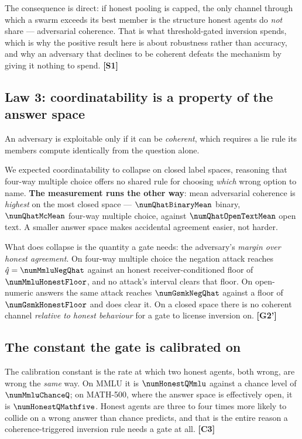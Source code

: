 The consequence is direct: if honest pooling is capped, the only channel through
which a swarm exceeds its best member is the structure honest agents do
\emph{not} share --- adversarial coherence. That is what threshold-gated
inversion spends, which is why the positive result here is about robustness
rather than accuracy, and why an adversary that declines to be coherent defeats
the mechanism by giving it nothing to spend. \textbf{[S1]}

\subsection{Law 3: coordinatability is a property of the answer space}

An adversary is exploitable only if it can be \emph{coherent}, which requires a
lie rule its members compute identically from the question alone.

We expected coordinatability to collapse on closed label spaces, reasoning that
four-way multiple choice offers no shared rule for choosing \emph{which} wrong
option to name. \textbf{The measurement runs the other way}: mean adversarial
coherence is \emph{highest} on the most closed space --- $\numQhatBinaryMean$
binary, $\numQhatMcMean$ four-way multiple choice, against
$\numQhatOpenTextMean$ open text. A smaller answer space makes accidental
agreement easier, not harder.

What does collapse is the quantity a gate needs: the adversary's \emph{margin
over honest agreement}. On four-way multiple choice the negation attack reaches
$\hat q = \numMmluNegQhat$ against an honest receiver-conditioned floor of
$\numMmluHonestFloor$, and no attack's interval clears that floor. On
open-numeric answers the same attack reaches $\numGsmkNegQhat$ against a floor of
$\numGsmkHonestFloor$ and does clear it. On a closed space there is no coherent
channel \emph{relative to honest behaviour} for a gate to license inversion on.
\textbf{[G2']}

\subsection{The constant the gate is calibrated on}

The calibration constant is the rate at which two honest agents, both wrong, are
wrong the \emph{same} way. On MMLU it is $\numHonestQMmlu$ against a chance level
of $\numMmluChanceQ$; on MATH-500, where the answer space is effectively open, it
is $\numHonestQMathfive$. Honest agents are three to four times more likely to
collide on a wrong answer than chance predicts, and that is the entire reason a
coherence-triggered inversion rule needs a gate at all. \textbf{[C3]}

